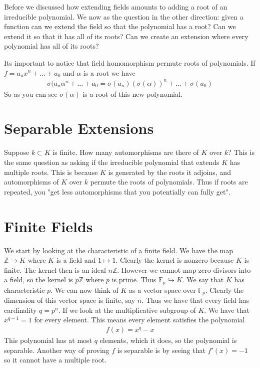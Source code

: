 \documentclass[12pt]{book}
\begin{document}
Before we discussed how extending fields amounts to adding a root of an irreducible polynomial. We now as the question in the other direction: given a function can we extend the field so that the polynomial has a root? Can we extend it  so that it has all of its roots? Can we create an extension where every polynomial has all of its roots? 

Its important to notice that field homomorphism permute roots of polynomials. If $f=a_n x^n + \ldots + a_0$ and $\alpha$ is a root we have
\begin{align*}
\sigma(a_n \alpha^n+ \ldots+a_0=\sigma(a_n)(\sigma(\alpha))^n+\ldots + \sigma(a_0)
\end{align*}
 So as you can see $\sigma(\alpha)$ is a root of this new polynomial. 
\section{Separable Extensions}
Suppose $k \subset K$ is finite. How many automorphisms are there of $K$ over $k$? This is the same question as asking if the irreducible polynomial that extends $K$ has multiple roots. This is because $K$ is generated by the roots it adjoins, and automorphisms of $K$ over $k$ permute the roots of polynomials. Thus if roots are repeated, you "get less automorphisms that you potentially can fully get".
  

\section{Finite Fields}
We start by looking at the characteristic of a finite field. We have the map $\mathbb{Z} \rightarrow K$ where $K$ is a field and $1 \mapsto 1$. Clearly the kernel is nonzero because $K$ is finite. The kernel then is an ideal $n \mathbb{Z}$. However we cannot map zero divisors into a field, so the kernel is $p \mathbb{Z}$ where $p$ is prime. Thus $\mathbb{F}_p \hookrightarrow K$. We say that $K$ has characteristic $p$.  We can now think of $K$ as a vector space over $\mathbb{F}_p$. Clearly the dimension of this vector space is finite, say $n$. Thus we have that every field has cardinality $q=p^n$. If we look at the multiplicative subgroup of $K$. We have that $x^{q-1}=1$ for every element. This means every element satisfies the polynomial
\begin{align*}
f(x)=x^{q}-x
\end{align*}
This polynomial has at most $q$ elements, which it does, so the polynomial is separable. Another way of proving $f$ is separable is by seeing that $f'(x)=-1$ so it cannot have a multiple root.
\end{document}

